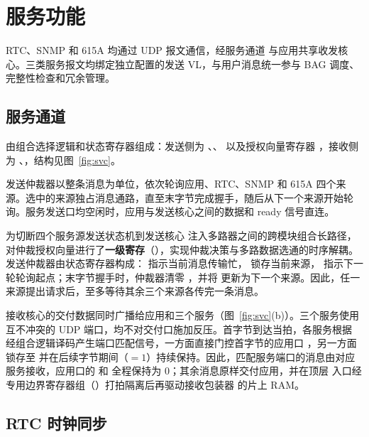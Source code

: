 \chapter{服务功能}\label{ch:svc}

RTC、SNMP 和 615A 均通过 UDP 报文通信，经服务通道  与应用共享收发核心。三类服务报文均绑定独立配置的发送 VL，与用户消息统一参与 BAG 调度、完整性检查和冗余管理。


\section{服务通道}\label{sec:svcch}

 由组合选择逻辑和状态寄存器组成：发送侧为 、、 以及授权向量寄存器 ，接收侧为 、，结构见图~\ref{fig:svc}。


发送仲裁器以整条消息为单位，依次轮询应用、RTC、SNMP 和 615A 四个来源。选中的来源独占消息通路，直至末字节完成握手，随后从下一个来源开始轮询。服务发送口均空闲时，应用与发送核心之间的数据和 ready 信号直连。

为切断四个服务源发送状态机到发送核心  注入多路器之间的跨模块组合长路径， 对仲裁授权向量进行了\textbf{一级寄存}（），实现仲裁决策与多路数据选通的时序解耦。发送仲裁器由状态寄存器构成： 指示当前消息传输忙， 锁存当前来源， 指示下一轮轮询起点；末字节握手时，仲裁器清零 ，并将  更新为下一个来源。因此，任一来源提出请求后，至多等待其余三个来源各传完一条消息。

接收核心的交付数据同时广播给应用和三个服务（图~\ref{fig:svc}(b)）。三个服务使用互不冲突的 UDP 端口，均不对交付口施加反压。首字节到达当拍，各服务根据  经组合逻辑译码产生端口匹配信号，一方面直接门控首字节的应用口 ，另一方面锁存至  并在后续字节期间（$=1$）持续保持。因此，匹配服务端口的消息由对应服务接收，应用口的  和  全程保持为 0；其余消息原样交付应用，并在顶层  入口经专用边界寄存器组（）打拍隔离后再驱动接收包装器  的片上 RAM。

\section{RTC 时钟同步}\label{sec:rtc}

